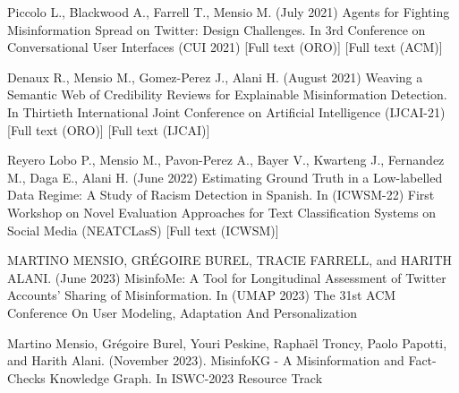 Piccolo L., Blackwood A., Farrell T., Mensio M. (July 2021) Agents for Fighting Misinformation Spread on Twitter: Design Challenges. In 3rd Conference on Conversational User Interfaces (CUI 2021) [Full text (ORO)] [Full text (ACM)]

Denaux R., Mensio M., Gomez-Perez J., Alani H. (August 2021) Weaving a Semantic Web of Credibility Reviews for Explainable Misinformation Detection. In Thirtieth International Joint Conference on Artificial Intelligence (IJCAI-21) [Full text (ORO)] [Full text (IJCAI)]

Reyero Lobo P., Mensio M., Pavon-Perez A., Bayer V., Kwarteng J., Fernandez M., Daga E., Alani H. (June 2022) Estimating Ground Truth in a Low-labelled Data Regime: A Study of Racism Detection in Spanish. In (ICWSM-22) First Workshop on Novel Evaluation Approaches for Text Classification Systems on Social Media (NEATCLasS) [Full text (ICWSM)]


MARTINO MENSIO, GRÉGOIRE BUREL, TRACIE FARRELL, and HARITH ALANI. (June 2023) MisinfoMe: A Tool for Longitudinal Assessment of Twitter Accounts’ Sharing of Misinformation. In (UMAP 2023) The 31st ACM Conference On User Modeling, Adaptation And Personalization

Martino Mensio, Grégoire Burel, Youri Peskine, Raphaël Troncy, Paolo Papotti, and Harith Alani. (November 2023).
MisinfoKG - A Misinformation and Fact-Checks
Knowledge Graph. In ISWC-2023 Resource Track
